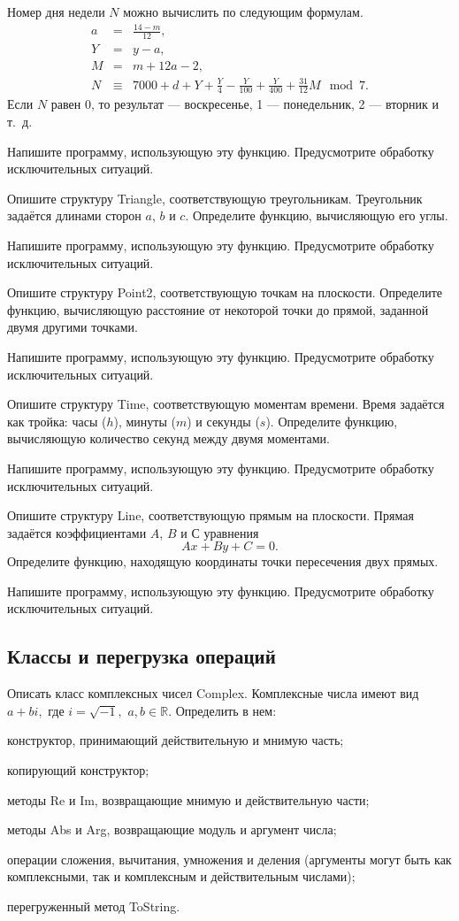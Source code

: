 Номер дня недели $N$ можно вычислить по следующим формулам.
\begin{eqnarray*}
a &=& \frac{14 - m}{12},\\
Y &=& y - a,\\
M &=& m + 12a - 2,\\
N &\equiv& 7000 + d + Y + \frac{Y}{4} - \frac{Y}{100} + \frac{Y}{400} + \frac{31}{12}M \mod 7.
\end{eqnarray*}
Если $N$ равен 0, то результат — воскресенье, 1 — понедельник, 2 —
вторник и т.~д.

Напишите программу, использующую эту функцию. Предусмотрите обработку
исключительных ситуаций.

\task Опишите структуру Triangle, соответствующую
треугольникам. Треугольник задаётся длинами сторон $a$, $b$ и $c$.
Определите функцию, вычисляющую его углы.

Напишите программу, использующую эту функцию. Предусмотрите обработку
исключительных ситуаций.

\task Опишите структуру Point2, соответствующую точкам на
плоскости. Определите функцию, вычисляющую расстояние от некоторой
точки до прямой, заданной двумя другими точками.

Напишите программу, использующую эту функцию. Предусмотрите обработку
исключительных ситуаций.

\task Опишите структуру Time, соответствующую моментам времени. Время
задаётся как тройка: часы ($h$), минуты ($m$) и секунды
($s$). Определите функцию, вычисляющую количество секунд между двумя
моментами.

Напишите программу, использующую эту функцию. Предусмотрите обработку
исключительных ситуаций.

\task Опишите структуру Line, соответствующую прямым на
плоскости. Прямая задаётся коэффициентами $A$, $B$ и $С$ уравнения
\[
Ax+By+C=0.
\]
Определите функцию, находящую координаты точки пересечения двух
прямых.

Напишите программу, использующую эту функцию. Предусмотрите обработку
исключительных ситуаций.


\subsection{Классы и перегрузка операций}

\task Описать класс комплексных чисел Complex. Комплексные числа имеют
вид $a+bi,$ где $i=\sqrt{-1},$ $a,b \in \mathbb{R}$. Определить в нем:
\begin{itemize*}
\item конструктор, принимающий действительную и мнимую часть;
\item копирующий конструктор;
\item методы Re и Im, возвращающие мнимую и действительную части;
\item методы Abs и Arg, возвращающие модуль и аргумент числа;
\item операции сложения, вычитания, умножения и деления (аргументы
  могут быть как комплексными, так и комплексным и действительным
  числами);
\item перегруженный метод ToString.
\end{itemize*}


